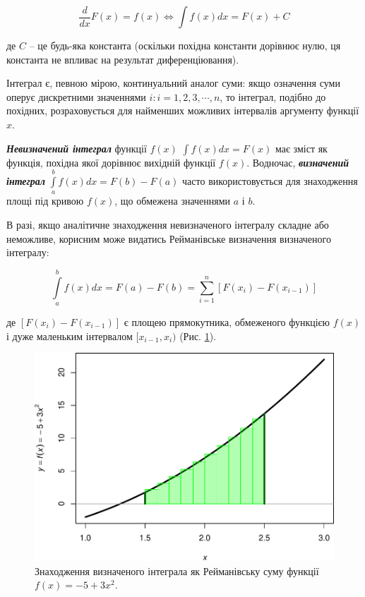 \documentclass[
  11pt,
]{book}
\begin{document}
\[\frac{d}{dx}F(x) = f(x) \iff \int f(x) dx = F(x) + C\]

де \(C\) -- це будь-яка константа (оскільки похідна константи дорівнює нулю, ця константа не впливає на результат диференціювання).

Інтеграл є, певною мірою, континуальний аналог суми: якщо означення суми оперує дискретними значеннями \(i: i = 1, 2, 3, \cdots, n\), то інтеграл, подібно до похідних, розраховується для найменших можливих інтервалів аргументу функції \(x\).

\textbf{\emph{Невизначений інтеграл}} функції \(f(x)\) \(\int f(x)dx = F(x)\) має зміст як функція, похідна якої дорівнює вихідній функції \(f(x)\). Водночас, \textbf{\emph{визначений інтеграл}} \(\int\limits_a^b f(x) dx = F(b) - F(a)\) часто використовується для знаходження площі під кривою \(f(x)\), що обмежена значеннями \(a\) і \(b\).

В разі, якщо аналітичне знаходження невизначеного інтегралу складне або неможливе, корисним може видатись Рейманівське визначення визначеного інтегралу:

\[\int\limits_a^b f(x) dx = F(a) - F(b) = \sum\limits_{i=1}^n [F(x_i) - F(x_{i-1})]\]

де \([F(x_i) - F(x_{i-1})]\) є площею прямокутника, обмеженого функцією \(f(x)\) і дуже маленьким інтервалом \([x_{i-1}, x_i)\) (Рис. \ref{fig:fig-3-6}).

\begin{figure}
\centering
\includegraphics{bookdown-demo_files/figure-latex/fig-3-6-1.pdf}
\caption{\label{fig:fig-3-6}Знаходження визначеного інтеграла як Рейманівську суму функції \(f(x) = -5 + 3x^2\).}
\end{figure}
\end{document}
